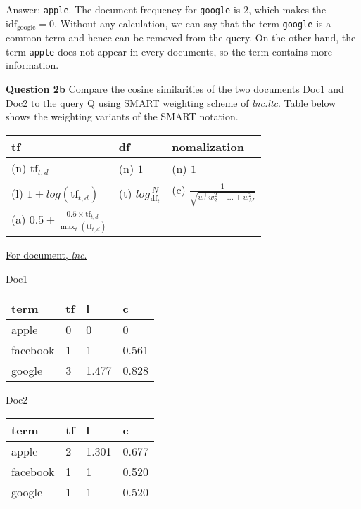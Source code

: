 \documentclass[11pt,a4paper]{report}
\begin{document}
\begin{multicols*}{2}
\noindent Answer: \verb|apple|. The document frequency for \verb|google| is 2, which makes the $\text{idf}_{\text{google}}=0$. Without any calculation, we can say that the term \verb|google| is a common term and hence can be removed from the query. On the other hand, the term \verb|apple| does not appear in every documents, so the term contains more information. 

\noindent \textbf{Question 2b} Compare the cosine similarities of the two documents Doc1 and Doc2 to the query Q using SMART weighting scheme of \textit{lnc.ltc}. Table below shows the weighting variants of the SMART notation.

\begin{center}
\begin{tabular}{|l | l | l|}
    \hline
    tf & df & nomalization \\
    \hline
    (n) $\text{tf}_{t,d}$ & (n) $1$ & (n) $1$ \\
    (l) $1 + log(\text{tf}_{t,d})$ & (t) $log \frac{N}{\text{df}_t}$ & (c) $\frac{1}{\sqrt{w_1^ + w_2^2 + \ldots + w_M^2}}$ \\
    (a) $0.5 + \frac{0.5 \times \text{tf}_{t,d}}{\max_t (\text{tf}_{t,d})}$ & & \\
    \hline
\end{tabular}
\end{center}

\noindent \underline{For document, \textit{lnc}.}

\noindent Doc1

\begin{center}
\begin{tabular}{|l | l | l | l|}
    \hline
    term     & tf & l & c \\
    \hline
    apple    & 0 & 0 & 0 \\
    facebook & 1 & 1 & 0.561\\
    google   & 3 & 1.477 & 0.828\\
    \hline
\end{tabular}
\end{center}

\noindent Doc2

\begin{center}
\begin{tabular}{|l | l | l | l|}
    \hline
    term     & tf & l & c \\
    \hline
    apple    & 2 & 1.301 & 0.677 \\
    facebook & 1 & 1 & 0.520\\
    google   & 1 & 1 & 0.520\\
    \hline
\end{tabular}
\end{center}


\end{multicols*}
\end{document}
